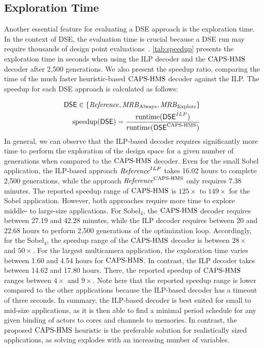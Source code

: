 \subsection{Exploration Time}\label{sec:expRuntime}

Another essential feature for evaluating a \ac{DSE} approach is the exploration time.
In the context of \ac{DSE}, the evaluation time is crucial because a \ac{DSE} run may require thousands of design point evaluations~\cite{PimentelExploringExploration}.
\cref{tab:speedup} presents the exploration time in seconds when using the \ac{ILP} decoder and the $\textup{{CAPS-HMS}}$ decoder after 2,500 generations.
We also present the speedup ratio, comparing the time of the much faster heuristic-based $\textup{{CAPS-HMS}}$ decoder against the \ac{ILP}.
The speedup for each \ac{DSE} approach is calculated as follows:
\par
\begin{equation}
\begin{split}
\mathsf{DSE} \in \{{\it Reference}, {\it MRB}_{\mathrm{Always}}, {\it MRB}_{\mathrm{Explore}} \}\\
\textup{speedup}(\mathsf{DSE}) = \dfrac{\textup{runtime}(\mathsf{DSE}^{ILP})}{\textup{runtime}(\mathsf{DSE}^{\textup{{CAPS-HMS}}})}
\end{split}
\end{equation}
\KeyObservation
In general, we can observe that the ILP-based decoder requires significantly more time to perform the exploration of the design space for a given number of generations when compared to the $\textup{{CAPS-HMS}}$ decoder.
Even for the small Sobel application, the ILP-based approach ${\it Reference}^{ILP}$ takes 16.02 hours to complete 2,500 generations, while the approach ${\it Reference}^{\textup{{CAPS-HMS}}}$ only requires 7.38 minutes.
The reported speedup range of $\textup{{CAPS-HMS}}$ is $125\times$ to $149\times$ for the Sobel application.
However, both approaches require more time to explore middle- to large-size applications.
For Sobel$_4$, the $\textup{{CAPS-HMS}}$ decoder requires between 27.19 and 42.28 minutes, while the \ac{ILP} decoder requires between 20 and 22.68 hours to perform 2,500 generations of the optimization loop.
Accordingly, for the Sobel$_4$, the speedup range of the $\textup{{CAPS-HMS}}$ decoder is between $28\times$ and $50\times$.
For the largest multicamera application, the exploration time varies between 1.60 and 4.54 hours for $\textup{{CAPS-HMS}}$.
In contrast, the ILP decoder takes between 14.62 and 17.80 hours.
There, the reported speedup of $\textup{{CAPS-HMS}}$ ranges between $4\times$ and $9\times$.
Note here that the reported speedup range is lower compared to the other applications because the ILP-based decoder has a timeout of three seconds.
In summary, the ILP-based decoder is best suited for small to mid-size applications, as it is then able to find a minimal period schedule for any given binding of actors to cores and channels to memories.
In contrast, the proposed $\textup{{CAPS-HMS}}$ heuristic is the preferable solution for realistically sized applications, as solving explodes with an increasing number of variables.
